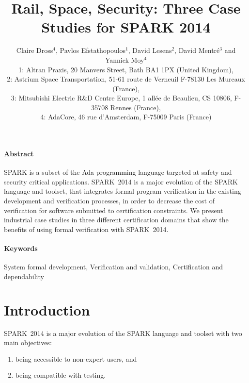 \documentclass[10pt,a4paper,twocolumn]{article}
\newcommand{\newspark}{SPARK~2014\xspace}
\begin{document}
\title{Rail, Space, Security: Three Case Studies for SPARK 2014}

\author{%
\large Claire Dross$^4$, Pavlos Efstathopoulos$^1$, David Lesens$^2$, David Mentré$^3$ and Yannick Moy$^4$\\
\normalsize 1: Altran Praxis, 20 Manvers Street, Bath BA1 1PX (United Kingdom),\\
\normalsize 2: Astrium Space Transportation, 51-61 route de Verneuil F-78130 Les Mureaux (France),\\
\normalsize 3: Mitsubishi Electric R\&D Centre Europe, 1 allée de
Beaulieu, CS 10806, F-35708 Rennes (France),\\
\normalsize 4: AdaCore, 46 rue d'Amsterdam, F-75009 Paris (France)}

\date{}

\maketitle

\paragraph{Abstract}
SPARK is a subset of the Ada programming language targeted at safety and
security critical applications. \newspark is a major evolution of the SPARK
language and toolset, that integrates formal program verification in the
existing development and verification processes, in order to decrease the cost
of verification for software submitted to certification constraints. We present
industrial case studies in three different certification domains that show the
benefits of using formal verification with \newspark.

\paragraph{Keywords}
System formal development, Verification and validation,
Certification and dependability

\section{Introduction}

\newspark is a major evolution of the SPARK language and toolset with two main
objectives:
%
\begin{enumerate}
\item being accessible to non-expert users, and
\item being compatible with testing.
\end{enumerate}
\end{document}

